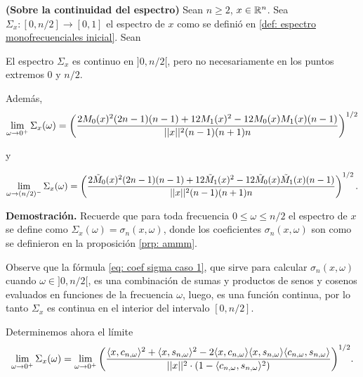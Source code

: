\begin{teo}
\label{teo: limite del espectro por cero}
\textbf{(Sobre la continuidad del espectro)}
Sean $n \geq 2$, $x \in \mathbb{R}^{n}$.
Sea $\Sigma_{x}: [0, n/2] \rightarrow [0,1]$ el espectro de $x$ como se definió
en \ref{def: espectro monofrecuenciales inicial}.
Sean

El espectro $\Sigma_{x}$ es continuo en $]0, n/2[$, pero no 
necesariamente en los puntos extremos $0$ y $n/2$.

Además,
\begin{equation}
\label{eq: limite del espectro a cero}
\lim\limits_{\omega \rightarrow 0^{+}}{\Sigma_{x}(\omega)}
=
\left(
\frac{
2M_{0}(x)^{2}(2n-1)(n-1) + 12M_{1}(x)^{2} - 12M_{0}(x)M_{1}(x)(n-1)
}{
||x||^{2} (n-1)(n+1)n}
\right)^{1/2}
\end{equation}

y

\begin{equation}
\label{eq: limite del espectro a n medios}
\lim\limits_{\omega \rightarrow (n/2)^{-}}{\Sigma_{x}(\omega)}
= \left(
\frac{
2\tilde{M}_{0}(x)^{2}(2n-1)(n-1) + 12\tilde{M}_{1}(x)^{2} - 
12\tilde{M}_{0}(x)\tilde{M}_{1}(x)(n-1)
}{
||x||^{2} (n-1)(n+1)n}
\right)^{1/2}.
\end{equation}
\end{teo}
\noindent
\textbf{Demostración.}
Recuerde que
para toda frecuencia
$0 \leq \omega \leq n/2$
el espectro de $x$ se define como 
$\Sigma_{x}(\omega) = \sigma_{n} (x, \omega)$,
donde los coeficientes
$\sigma_{n} (x, \omega)$ son como se definieron en
la proposición \ref{prp: ammm}.


Observe que la fórmula
\eqref{eq: coef sigma caso 1}, que sirve
para calcular $\sigma_{n} (x, \omega)$
cuando $\omega \in ]0, n/2[$, es una combinación
de sumas y productos de senos y cosenos
evaluados en funciones de la frecuencia $\omega$, luego, 
es una función continua, por lo tanto $\Sigma_{x}$
es continua en el interior del intervalo 
$[0, n/2]$.

Determinemos ahora 
el límite
\begin{equation}
\label{eq0: 22May}
\lim\limits_{\omega \rightarrow 0^{+}}{
\Sigma_{x}(\omega)}
= \lim\limits_{\omega \rightarrow 0^{+}}{
\left(		  
		  \frac{\langle x, c_{n, \omega } \rangle^{2} +  \langle x, s_{n, \omega } \rangle^{2}	
	       -2  \langle x, c_{n, \omega } \rangle \langle x, s_{n, \omega } \rangle \langle c_{n, \omega }, s_{n, \omega } \rangle}{ || x ||^{2} \cdot
	       (1- \langle c_{n, \omega }, s_{n, \omega } \rangle^{2})}	  
\right) ^{1/2}
}.
\end{equation}

